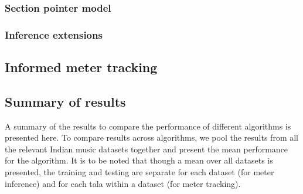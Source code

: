 \subsubsection{Section pointer model}

% 
\subsubsection{Inference extensions}

% 
\subsection{Informed meter tracking}


% 
\subsection{Summary of results}
A summary of the results to compare the performance of different algorithms is presented here. To compare results across algorithms, we pool the results from all the relevant Indian music datasets together and present the mean performance for the algorithm. It is to be noted that though a mean over all datasets is presented, the training and testing are separate for each dataset (for meter inference) and for each \gls{tala} within a dataset (for meter tracking).
